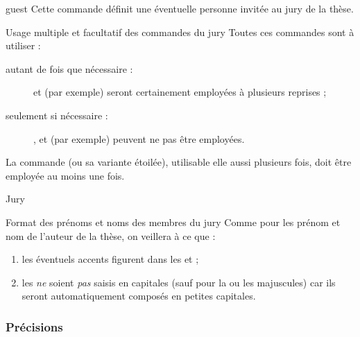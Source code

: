 \begin{docCommand}{guest}{}
  Cette commande définit une éventuelle personne invitée au jury de la thèse.
\end{docCommand}
%
\begin{dbwarning}{Usage multiple et facultatif des commandes du
    jury}{}
  Toutes ces commandes sont à utiliser :
  \begin{description}
  \item[autant de fois que nécessaire :]
     et  (par exemple) seront
    certainement employées à plusieurs reprises ;
  \item[seulement si nécessaire :]
    ,  et  (par
    exemple) peuvent ne pas être employées.
  \end{description}
  La commande  (ou sa variante étoilée), utilisable elle
  aussi plusieurs fois, doit être employée au moins une fois.
\end{dbwarning}

\begin{dbexample}{Jury}{}
\begin{bodycode}
%
%
%
\end{bodycode}
\end{dbexample}

\begin{dbwarning}{Format des prénoms et noms des membres du jury}{}
  Comme pour les prénom et nom de l'auteur de la thèse, on veillera à ce que :
  \begin{enumerate}
  \item les éventuels accents figurent dans les  et ;
  \item les  \emph{ne} soient \emph{pas} saisis en capitales (sauf
    pour la ou les majuscules) car ils seront automatiquement composés en
    petites capitales.
  \end{enumerate}
\end{dbwarning}

\subsubsection{Précisions}\label{sec:options-staff}

